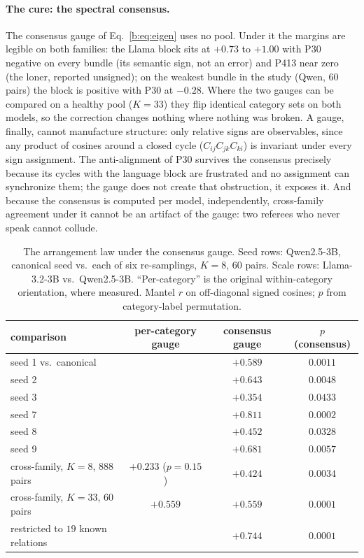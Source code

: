 \documentclass[11pt]{article}
\begin{document}
\paragraph{The cure: the spectral consensus.} The consensus gauge of
Eq.~\ref{b:eq:eigen} uses no pool. Under it the margins are legible on
both families: the Llama block sits at $+0.73$ to $+1.00$ with P30
negative on every bundle (its semantic sign, not an error) and P413 near
zero (the loner, reported unsigned); on the weakest bundle in the study
(Qwen, $60$ pairs) the block is positive with P30 at $-0.28$. Where the
two gauges can be compared on a healthy pool ($K{=}33$) they flip
identical category sets on both models, so the correction changes nothing
where nothing was broken. A gauge, finally, cannot manufacture structure:
only relative signs are observables, since any product of cosines around
a closed cycle ($C_{ij} C_{jk} C_{ki}$) is invariant under every sign
assignment. The anti-alignment of P30 survives the consensus precisely
because its cycles with the language block are frustrated and no
assignment can synchronize them; the gauge does not create that
obstruction, it exposes it. And because the consensus is computed
per model, independently, cross-family agreement under it cannot be an
artifact of the gauge: two referees who never speak cannot collude.

\begin{table}[H]
\centering
\caption{The arrangement law under the consensus gauge. Seed rows:
Qwen2.5-3B, canonical seed vs.\ each of six re-samplings, $K{=}8$, $60$
pairs. Scale rows: Llama-3.2-3B vs.\ Qwen2.5-3B. ``Per-category'' is the
original within-category orientation, where measured. Mantel $r$ on
off-diagonal signed cosines; $p$ from category-label permutation.}
\label{b:tab:stress}
\begin{tabular}{lccc}
\toprule
comparison & per-category gauge & consensus gauge & $p$ (consensus) \\
\midrule
seed 1 vs.\ canonical &  & $+0.589$ & $0.0011$ \\
seed 2 & & $+0.643$ & $0.0048$ \\
seed 3 & & $+0.354$ & $0.0433$ \\
seed 7 & & $+0.811$ & $0.0002$ \\
seed 8 & & $+0.452$ & $0.0328$ \\
seed 9 & & $+0.681$ & $0.0057$ \\
\midrule
cross-family, $K{=}8$, $888$ pairs & $+0.233$ ($p{=}0.15$) & $+0.424$ & $0.0034$ \\
cross-family, $K{=}33$, $60$ pairs & $+0.559$ & $+0.559$ & $0.0001$ \\
\quad restricted to $19$ known relations & & $+0.744$ & $0.0001$ \\
\bottomrule
\end{tabular}
\end{table}
\end{document}
